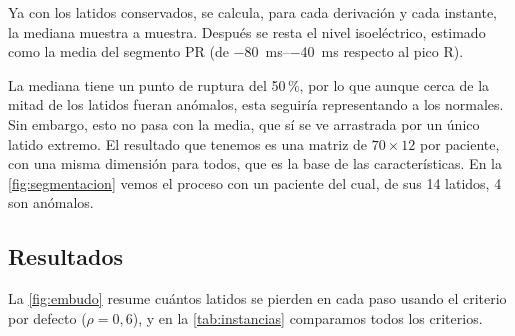Ya con los latidos conservados, se calcula, para cada derivación y cada instante, la mediana muestra a muestra. Después se resta el nivel isoeléctrico, estimado como la media del segmento PR (de \SIrange{-80}{-40}{\milli\second} respecto al pico R).

La mediana tiene un punto de ruptura del 50\,\%, por lo que aunque cerca de la mitad de los latidos fueran anómalos, esta seguiría representando a los normales. Sin embargo, esto no pasa con la media, que sí se ve arrastrada por un único latido extremo. El resultado que tenemos es una matriz de $70 \times 12$ por paciente, con una misma dimensión para todos, que es la base de las características. En la \cref{fig:segmentacion} vemos el proceso con un paciente del cual, de sus 14 latidos, 4 son anómalos.


\subsection{Resultados}

La \cref{fig:embudo} resume cuántos latidos se pierden en cada paso usando el criterio por defecto ($\rho = 0{,}6$), y en la \cref{tab:instancias} comparamos todos los criterios.

